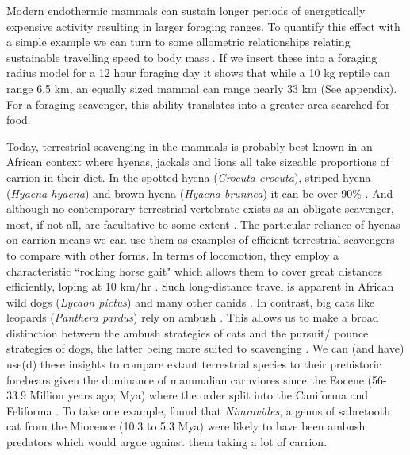 \documentclass[a4paper,12pt]{article}
\begin{document}
Modern endothermic mammals can sustain longer periods of energetically expensive activity \citep{bennett1979endothermy} resulting in larger foraging ranges. 
To quantify this effect with a simple example we can turn to some allometric relationships relating sustainable travelling speed to body mass \citep{ruxton2004obligate}.
If we insert these into a foraging radius model \citep{Enstipp2006Energetics} for a 12 hour foraging day it shows that while a 10 kg reptile can range 6.5 km, an equally sized mammal can range nearly 33 km (See appendix). 
For a foraging scavenger, this ability translates into a greater area searched for food. 

Today, terrestrial scavenging in the mammals is probably best known in an African context where hyenas, jackals and lions all take sizeable proportions of carrion in their diet.
In the spotted hyena (\textit{Crocuta crocuta}), striped hyena (\textit{Hyaena hyaena}) and brown hyena (\textit{Hyaena brunnea}) it can be over 90\% \citep{jones2015african}.
And although no contemporary terrestrial vertebrate exists as an obligate scavenger, most, if not all, are facultative to some extent \citep{beasley2015vertebrates}.
The particular reliance of hyenas on carrion means we can use them as examples of efficient terrestrial scavengers to compare with other forms. 
In terms of locomotion, they employ a characteristic ``rocking horse gait"  which allows them to cover great distances efficiently, loping at 10 km/hr \citep{mills1989comparative,jones2015african}. 
Such long-distance travel is apparent in African wild dogs (\textit{Lycaon pictus}) and many other canids \citep{pennycuick1995radius,janis2014forelimb}. 
In contrast, big cats like leopards (\textit{Panthera pardus}) rely on ambush \citep{pennycuick1995radius}. 
This allows us to make a broad distinction between the ambush strategies of cats and the pursuit/ pounce strategies of dogs, the latter being more suited to scavenging \citep{janis2014forelimb}. 
We can (and have) use(d) these insights to compare extant terrestrial species to their prehistoric forebears given the dominance of mammalian carnviores since the Eocene (56-33.9 Million years ago; Mya) where the order split into the Caniforma and Feliforma \citep{van1987skeletal}.
To take one example, \cite{anyonge1996locomotor} found that \textit{Nimravides}, a genus of sabretooth cat from the Miocence (10.3 to 5.3 Mya) were likely to have been ambush predators which would argue against them taking a lot of carrion. 
\end{document}
